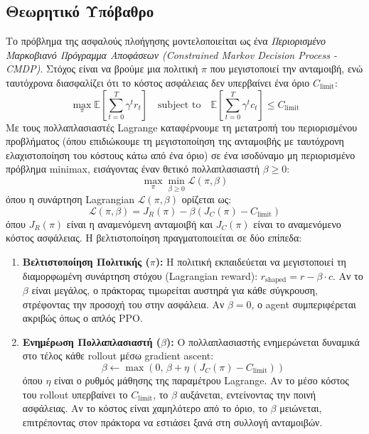 \documentclass[acmsmall,screen,nonacm]{acmart}
\begin{document}
	\subsection{Θεωρητικό Υπόβαθρο}
	Το πρόβλημα της ασφαλούς πλοήγησης μοντελοποιείται ως ένα \textit{Περιορισμένο Μαρκοβιανό Πρόγραμμα Αποφάσεων (Constrained Markov Decision Process - CMDP)}. Στόχος είναι να βρούμε μια πολιτική $\pi$ που μεγιστοποιεί την ανταμοιβή, ενώ ταυτόχρονα διασφαλίζει ότι το κόστος ασφάλειας δεν υπερβαίνει ένα όριο $C_{\text{limit}}$:
	\begin{equation}
		\max_{\pi} \mathbb{E} \left[ \sum_{t=0}^{T} \gamma^t r_t \right] \quad \text{subject to} \quad \mathbb{E} \left[ \sum_{t=0}^{T} \gamma^t c_t \right] \le C_{\text{limit}}
	\end{equation}
	Με τους πολλαπλασιαστές Lagrange καταφέρνουμε τη μετατροπή του περιορισμένου προβλήματος (όπου επιδιώκουμε τη μεγιστοποίηση της ανταμοιβής με ταυτόχρονη ελαχιστοποίηση του κόστους κάτω από ένα όριο) σε ένα ισοδύναμο μη περιορισμένο πρόβλημα minimax, εισάγοντας έναν θετικό πολλαπλασιαστή $\beta \ge 0$:
	\begin{equation}
		\max_{\pi} \min_{\beta \ge 0} \mathcal{L}(\pi, \beta)
	\end{equation}
	όπου η συνάρτηση Lagrangian $\mathcal{L}(\pi, \beta)$ ορίζεται ως:
	\begin{equation}
		\mathcal{L}(\pi, \beta) = J_R(\pi) - \beta (J_C(\pi) - C_{\text{limit}})
	\end{equation}
	όπου $J_R(\pi)$ είναι η αναμενόμενη ανταμοιβή και $J_C(\pi)$ είναι το αναμενόμενο κόστος ασφάλειας. Η βελτιστοποίηση πραγματοποιείται σε δύο επίπεδα:
	\begin{enumerate}
		\item \textbf{Βελτιστοποίηση Πολιτικής ($\pi$):} Η πολιτική εκπαιδεύεται να μεγιστοποιεί τη διαμορφωμένη συνάρτηση στόχου (Lagrangian reward): $r_{\text{shaped}} = r - \beta \cdot c$. Αν το $\beta$ είναι μεγάλος, ο πράκτορας τιμωρείται αυστηρά για κάθε σύγκρουση, στρέφοντας την προσοχή του στην ασφάλεια. Αν $\beta = 0$, ο agent συμπεριφέρεται ακριβώς όπως ο απλός PPO.
		\item \textbf{Ενημέρωση Πολλαπλασιαστή ($\beta$):} Ο πολλαπλασιαστής ενημερώνεται δυναμικά στο τέλος κάθε rollout μέσω gradient ascent:
		\begin{equation}
			\beta \leftarrow \max\left(0, \, \beta + \eta \, (J_C(\pi) - C_{\text{limit}})\right)
		\end{equation}
		όπου $\eta$ είναι ο ρυθμός μάθησης της παραμέτρου Lagrange. Αν το μέσο κόστος του rollout υπερβαίνει το $C_{\text{limit}}$, το $\beta$ αυξάνεται, εντείνοντας την ποινή ασφάλειας. Αν το κόστος είναι χαμηλότερο από το όριο, το $\beta$ μειώνεται, επιτρέποντας στον πράκτορα να εστιάσει ξανά στη συλλογή ανταμοιβών.
	\end{enumerate}
\end{document}

